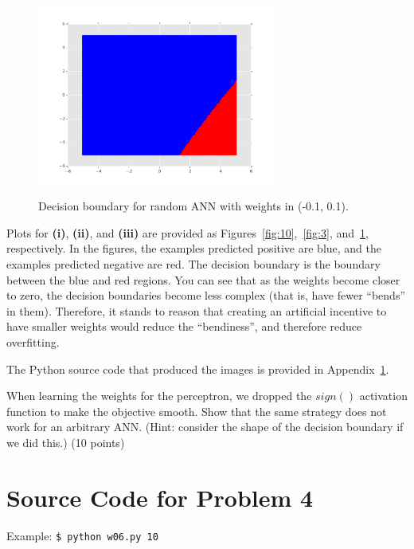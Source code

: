 \documentclass[fleqn]{homework}
\begin{document}
\begin{problem}{4}
    \begin{figure}
      \centering
      \caption{Decision boundary for random ANN with weights in (-0.1, 0.1).}
      \includegraphics[width=0.7\textwidth]{0_1.pdf}
      \label{fig:0.1}
    \end{figure}

    Plots for \textbf{(i)}, \textbf{(ii)}, and \textbf{(iii)} are provided as
    Figures~\ref{fig:10},~\ref{fig:3}, and~\ref{fig:0.1}, respectively.  In the
    figures, the examples predicted positive are blue, and the examples
    predicted negative are red.  The decision boundary is the boundary between
    the blue and red regions.  You can see that as the weights become closer to
    zero, the decision boundaries become less complex (that is, have fewer
    ``bends'' in them).  Therefore, it stands to reason that creating an
    artificial incentive to have smaller weights would reduce the ``bendiness'',
    and therefore reduce overfitting.

    The Python source code that produced the images is provided in
    Appendix~\ref{p4src}.
  \end{problem}

  \begin{problem}{5}
    \begin{question}
      When learning the weights for the perceptron, we dropped the $sign()$
      activation function to make the objective smooth. Show that the same
      strategy does not work for an arbitrary ANN.  (Hint: consider the shape of
      the decision boundary if we did this.) (10 points)
    \end{question}
  \end{problem}

  \newpage
  \appendix
  \section{Source Code for Problem 4}
  \label{p4src}
  

  Example: \texttt{\$ python w06.py 10}
\end{document}
